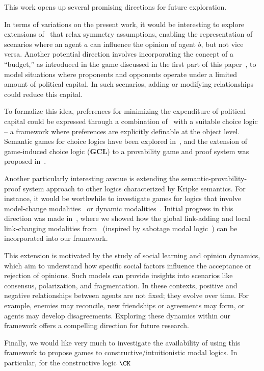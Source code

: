 
This work opens up several promising directions for future exploration.

In terms of variations on the present work, it would be interesting to explore extensions of \PNL\ that relax symmetry assumptions, enabling the representation of scenarios where an agent $a$ can influence the opinion of agent $b$, but not vice versa. Another potential direction involves incorporating the concept of a ``budget,'' as introduced in the game discussed in the first part of this paper~\cite{DBLP:conf/tableaux/LangOPF19}, to model situations where proponents and opponents operate under a limited amount of political capital. In such scenarios, adding or modifying relationships could reduce this capital.

To formalize this idea, preferences for minimizing the expenditure of political capital could be expressed through a combination of \PNL\ with a suitable choice logic -- a framework where preferences are explicitly definable at the object level. Semantic games for choice logics have been explored in~\cite{Freiman2023TruthLogic}, and the extension of game-induced choice logic (\textbf{GCL}) to a provability game and proof system was proposed in~\cite{Freiman2023}. 

Another particularly interesting avenue is extending the semantic-provability-proof system approach to other logics characterized by Kripke semantics. For instance, it would be worthwhile to investigate games for logics that involve model-change modalities~\cite{DBLP:journals/logcom/Velazquez-Quesada17,DBLP:journals/igpl/PerrotinV21} or dynamic modalities~\cite{DBLP:journals/synthese/BenthemGL08}. Initial progress in this direction was made in~\cite{LPAR2024:Reasoning_About_Group_Polarization}, where we showed how the global link-adding and local link-changing modalities from~\cite{DBLP:journals/logcom/PedersenSA21} (inspired by sabotage modal logic~\cite{DBLP:journals/igpl/ArecesFH15,DBLP:journals/logcom/AucherBG18,DBLP:journals/logcom/BenthemLSY23}) can be incorporated into our framework.

This extension is motivated by the study of social learning and opinion dynamics, which aim to understand how specific social factors influence the acceptance or rejection of opinions. Such models can provide insights into scenarios like consensus, polarization, and fragmentation. In these contexts, positive and negative relationships between agents are not fixed; they evolve over time. For example, enemies may reconcile, new friendships or agreements may form, or agents may develop disagreements. Exploring these dynamics within our framework offers a compelling direction for future research. 

Finally, we would like very much to investigate the availability of using this framework to propose games to constructive/intuitionistic modal logics. In particular, for the constructive logic $\CK$